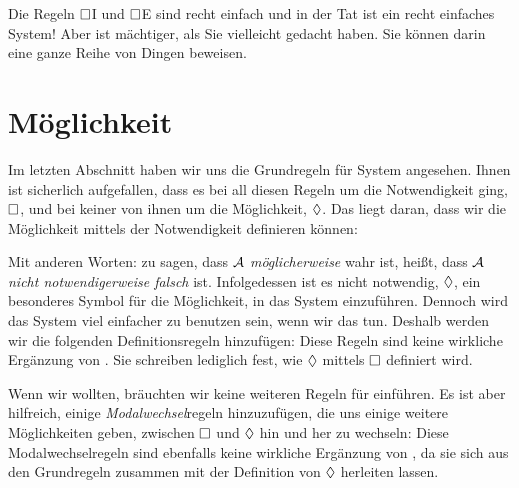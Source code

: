 Die Regeln $\Box$I und $\Box$E sind recht einfach und in der Tat ist \mlK{} ein recht einfaches System! Aber \mlK{} ist mächtiger, als Sie vielleicht gedacht haben. Sie können darin eine ganze Reihe von Dingen beweisen.

\section{Möglichkeit}
\label{possibility}

Im letzten Abschnitt haben wir uns die Grundregeln für System \mlK{} angesehen. Ihnen ist sicherlich aufgefallen, dass es bei all diesen Regeln um die Notwendigkeit ging, $\Box$, und bei keiner von ihnen um die Möglichkeit, $\Diamond$. Das liegt daran, dass wir die Möglichkeit mittels der Notwendigkeit definieren können:

Mit anderen Worten: zu sagen, dass $\mathcal{A}$ \emph{möglicherweise} wahr ist, hei{\ss}t, dass $\mathcal{A}$ \emph{nicht notwendigerweise falsch} ist. Infolgedessen ist es nicht notwendig, $\Diamond$, ein besonderes Symbol für die Möglichkeit, in das System \mlK{} einzuführen. Dennoch wird das System viel einfacher zu benutzen sein, wenn wir das tun. Deshalb werden wir die folgenden Definitionsregeln hinzufügen:
Diese Regeln sind keine wirkliche Ergänzung von \mlK. Sie schreiben lediglich fest, wie $\Diamond$ mittels $\Box$ definiert wird.

Wenn wir wollten, bräuchten wir keine weiteren Regeln für \mlK{} einführen. Es ist aber hilfreich, einige \emph{Modalwechsel}regeln hinzuzufügen, die uns einige weitere Möglichkeiten geben, zwischen $\Box$ und $\Diamond$ hin und her zu wechseln:
Diese Modalwechselregeln sind ebenfalls keine wirkliche Ergänzung von \mlK, da sie sich aus den Grundregeln zusammen mit der Definition von $\Diamond$ herleiten lassen.

